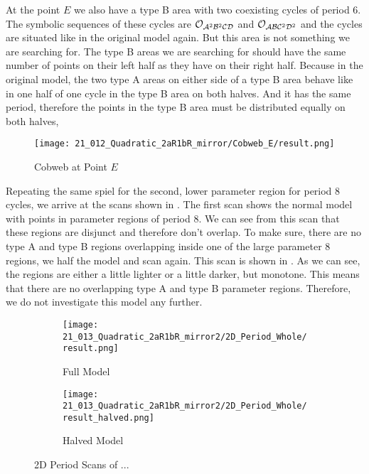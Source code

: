 At the point $E$ we also have a type B area with two coexisting cycles of period 6.
The symbolic sequences of these cycles are $\mathcal{O}_{\mathcal{A}^2\mathcal{B}^2\mathcal{C}\mathcal{D}}$ and $\mathcal{O}_{\mathcal{A}\mathcal{B}\mathcal{C}^2\mathcal{D}^2}$ and the cycles are situated like in the original model again.
But this area is not something we are searching for.
The type B areas we are searching for should have the same number of points on their left half as they have on their right half.
Because in the original model, the two type A areas on either side of a type B area behave like in one half of one cycle in the type B area on both halves.
And it has the same period, therefore the points in the type B area must be distributed equally on both halves,

\begin{figure}
	\centering
	\texttt{[image: 21\_012\_Quadratic\_2aR1bR\_mirror/Cobweb\_E/result.png]}
	\caption{Cobweb at Point $E$}
	\label{fig:quadratic.full.2aR1bR_mirr.1.CobwebE}
\end{figure}

Repeating the same spiel for the second, lower parameter region for period 8 cycles, we arrive at the scans shown in .
The first scan shows the normal model with points in parameter regions of period 8.
We can see from this scan that these regions are disjunct and therefore don't overlap.
To make sure, there are no type A and type B regions overlapping inside one of the large parameter 8 regions, we half the model and scan again.
This scan is shown in .
As we can see, the regions are either a little lighter or a little darker, but monotone.
This means that there are no overlapping type A and type B parameter regions.
Therefore, we do not investigate this model any further.

\begin{figure}
	\centering
	\begin{subfigure}{0.4\textwidth}
		\centering
		\texttt{[image: 21\_013\_Quadratic\_2aR1bR\_mirror2/2D\_Period\_Whole/result.png]}
		\caption{Full Model}
		\label{fig:quad.full.2aR1bR_cL_mirr.2.whole}
	\end{subfigure}
	\begin{subfigure}{0.4\textwidth}
		\centering
		\texttt{[image: 21\_013\_Quadratic\_2aR1bR\_mirror2/2D\_Period\_Whole/result\_halved.png]}
		\caption{Halved Model}
		\label{fig:quad.full.2aR1bR_cL_mirr.2.Halved}
	\end{subfigure}
	\caption{2D Period Scans of ...}
	\label{fig:quad.full.2aR1bR_cL_mirr.2.Period}
\end{figure}
